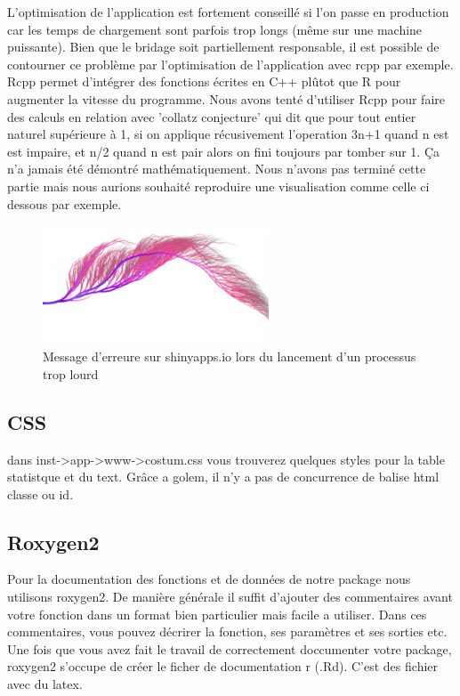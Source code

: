 \documentclass[a4paper, twoside]{article}
\begin{document}
	L'optimisation de l'application est fortement 
conseillé si l'on passe en production car les temps de chargement sont parfois 
trop longs (même sur une machine puissante). Bien que le bridage soit 
partiellement responsable, il est possible de contourner ce problème par 
l'optimisation de l'application avec rcpp par exemple. Rcpp permet d'intégrer 
des fonctions écrites en C++ plûtot que R pour augmenter la vitesse du 
programme. Nous avons tenté d'utiliser Rcpp pour faire des calculs en relation 
avec 'collatz conjecture' qui dit que pour tout entier naturel supérieure à 1,
si on applique récusivement l'operation 3n+1 quand n est est impaire, et n/2 quand n est 
pair alors on fini toujours par tomber sur 1. Ça n'a jamais été démontré 
mathématiquement. Nous n'avons pas terminé cette partie mais nous aurions 
souhaité reproduire une visualisation comme celle ci dessous par exemple.

\begin{figure}[h]
\caption{Message d'erreure sur shinyapps.io lors du lancement d'un processus trop lourd}
\centering
\includegraphics[width=0.6\textwidth]{collatz}
\end{figure}

\subsection{CSS}
dans inst->app->www->costum.css vous trouverez quelques styles pour la table 
statistque et du text. Grâce a golem, il n'y a pas de concurrence de 
balise html classe ou id.

\subsection{Roxygen2}
Pour la documentation des fonctions et de données de notre package nous 
utilisons roxygen2. De manière générale il suffit d'ajouter des commentaires 
avant votre fonction dans un format bien particulier mais facile a utiliser.
Dans ces commentaires, vous pouvez décrirer la fonction, ses paramètres et ses 
sorties etc. Une fois que vous avez fait le travail de correctement doccumenter 
votre package, roxygen2 s'occupe de créer le ficher de documentation r (.Rd).
C'est des fichier avec du latex.




\end{document}
